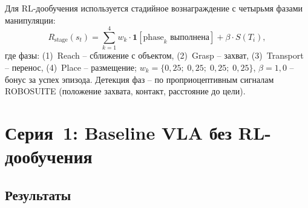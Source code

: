     Для RL-дообучения используется стадийное вознаграждение с четырьмя фазами манипуляции:
\begin{equation}
\label{eq:stage_reward}
    R_{\text{stage}}(s_t) = \sum_{k=1}^{4} w_k \cdot \mathbf{1}[\text{phase}_k \text{ выполнена}] + \beta \cdot S(T_i),
\end{equation}
где фазы: (1)~Reach -- сближение с объектом, (2)~Grasp -- захват, (3)~Transport -- перенос, (4)~Place -- размещение; $w_k = \{0{,}25;\; 0{,}25;\; 0{,}25;\; 0{,}25\}$, $\beta = 1{,}0$ -- бонус за успех эпизода. Детекция фаз -- по проприоцептивным сигналам ROBOSUITE (положение захвата, контакт, расстояние до цели).

\section{Серия~1: Baseline VLA без RL-дообучения}
\label{sec:vla_baseline}

\subsection{Результаты}
\label{subsec:vla_baseline_sr}

\begin{table}[htbp]
\caption{Success rate (\%) VLA-моделей на LIBERO без RL (серия~1).}
\label{tab:vla_baseline}
\centering
\footnotesize
\setlength{\tabcolsep}{4pt}
\renewcommand{\arraystretch}{1.15}
\end{table}

